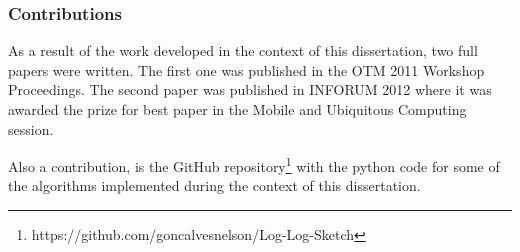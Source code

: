 \subsubsection{Contributions}
\label{sec:contributions}
As a result of the work developed in the context of this dissertation,
two full papers were written. The first one
\cite{gonccalves2011privacy} was published in the OTM 2011 Workshop
Proceedings.  The second paper \cite{inforum2012} was published in
INFORUM 2012 where it was awarded the prize for best paper in the
Mobile and Ubiquitous Computing session.

Also a contribution, is the GitHub
repository\footnote{https://github.com/goncalvesnelson/Log-Log-Sketch}
with the python code for some of the algorithms implemented during
the context of this dissertation.


